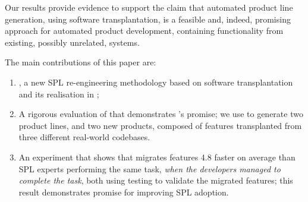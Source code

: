 Our results provide evidence to support the claim that automated product line generation, using software transplantation, is a feasible and, indeed, promising approach for automated product development, containing functionality from existing, possibly unrelated, systems.

The main contributions of this paper are: 
\begin{enumerate}
    \item \FOUNDRY, a new SPL re-engineering methodology based on software transplantation and its realisation in \autoscalpel;
    \item A rigorous evaluation of \autoscalpel that demonstrates \FOUNDRY's promise; we use \autoscalpel to generate two product lines, and two new products, composed of features transplanted from three different real-world codebases.
    \item An experiment that shows that \autoscalpel migrates features 4.8 faster on average than SPL experts performing the same task, \emph{when the developers managed to complete the task}, both using testing to validate the migrated features; this result demonstrates \autoscalpel promise for improving SPL adoption. 
\end{enumerate}

 
